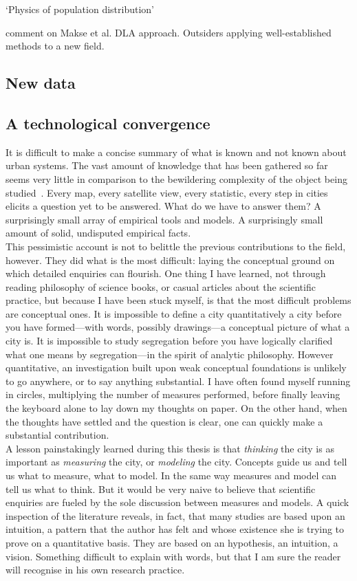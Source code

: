 \cite{Stewart:1959} `Physics of population distribution'

\cite{Batty:1995} comment on Makse et al. DLA approach.
Outsiders applying well-established methods to a new field.
    \subsection{New data}
    \label{sub:new_data}
    
    \subsection{A technological convergence}
    \label{sub:a_technological_convergence} 

It is difficult to make a concise summary of what is known and not known about
urban systems. The vast amount of knowledge that has been gathered so far seems
very little in comparison to the bewildering complexity of the object being
studied~\cite{Batty:2008}. Every map, every satellite view, every statistic, every step
in cities elicits a question yet to be answered. What do we have to answer them?
A surprisingly small array of empirical tools and models. A surprisingly small
amount of solid, undisputed empirical facts.\\

This pessimistic account is not to belittle the previous contributions to the
field, however. They did what is the most difficult: laying the conceptual
ground on which detailed enquiries can flourish. One thing I have learned, not
through reading philosophy of science books, or casual articles about the
scientific practice, but because I have been stuck myself, is that the most
difficult problems are conceptual ones. It is impossible to define a city
quantitatively a city before you have formed---with words, possibly drawings---a
conceptual picture of what a city is. It is impossible to study segregation
before you have logically clarified what one means by segregation---in the
spirit of analytic philosophy. However quantitative, an investigation built upon
weak conceptual foundations is unlikely to go anywhere, or to say anything
substantial. I have often found myself running in circles, multiplying the
number of measures performed, before finally leaving the keyboard alone to lay
down my thoughts on paper. On the other hand, when the thoughts have settled and
the question is clear, one can quickly make a substantial contribution.\\

A lesson painstakingly learned during this thesis is that \emph{thinking} the
city is as important as \emph{measuring} the city, or \emph{modeling} the city.
Concepts guide us and tell us what to measure, what to model. In the same way
measures and model can tell us what to think. But it would be very naive to
believe that scientific enquiries are fueled by the sole discussion between
measures and models. A quick inspection of the literature reveals, in fact, that
many studies are based upon an intuition, a pattern that the author has felt and
whose existence she is trying to prove on a quantitative basis. They are based
on an hypothesis, an intuition, a vision. Something difficult to explain with
words, but that I am sure the reader will recognise in his own research
practice.
